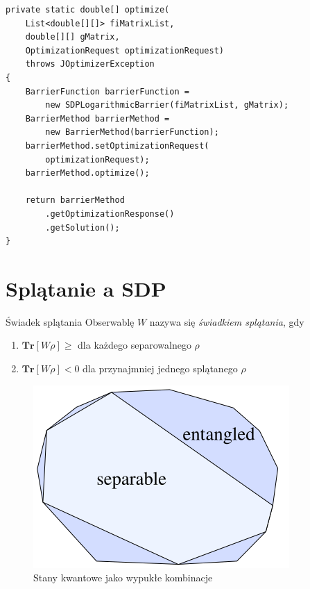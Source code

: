 \documentclass{beamer}
\begin{document}
\begin{frame}[fragile]
    \begin{Verbatim}[fontsize=\small]
private static double[] optimize(
    List<double[][]> fiMatrixList,
    double[][] gMatrix,
    OptimizationRequest optimizationRequest)
    throws JOptimizerException
{
    BarrierFunction barrierFunction =
        new SDPLogarithmicBarrier(fiMatrixList, gMatrix);
    BarrierMethod barrierMethod =
        new BarrierMethod(barrierFunction);
    barrierMethod.setOptimizationRequest(
        optimizationRequest);
    barrierMethod.optimize();

    return barrierMethod
        .getOptimizationResponse()
        .getSolution();
}
    \end{Verbatim}
\end{frame}

\section{Splątanie a SDP}

\begin{frame}
    \begin{exampleblock}{Świadek splątania}
        Obserwablę $W$ nazywa się \textit{świadkiem splątania}, gdy

        \begin{enumerate}
            \item $\textbf{Tr}[W \rho] \geq$ dla każdego separowalnego $\rho$
            \item $\textbf{Tr}[W \rho] < 0$ dla przynajmniej jednego splątanego $\rho$
        \end{enumerate}
    \end{exampleblock}
\end{frame}

\begin{frame}
    \begin{figure}
        \caption{Stany kwantowe jako wypukłe kombinacje}
        \includegraphics[scale=0.5]{images/convex-set.png}
    \end{figure}
\end{frame}
\end{document}
